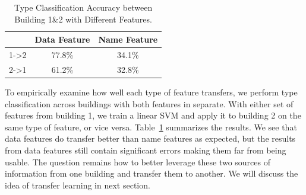 \begin{table}[h]
\centering
\begin{tabular}{l|c|c}
\hline
                & Data Feature & Name Feature \\ \hline
1-\textgreater2 & 77.8\%       & 34.1\%       \\
2-\textgreater1 & 61.2\%       & 32.8\%       \\ \hline
\end{tabular}
\caption{Type Classification Accuracy between Building 1\&2 with Different Features.}
\label{table:clf}
\end{table}


To empirically examine how well each type of feature transfers, we perform type classification across buildings with both features in separate. With either set of features from building 1, we train a linear SVM and apply it to building 2 on the same type of feature, or vice versa. Table~\ref{table:clf} summarizes the results.
We see that data features do transfer better than name features as expected, but the results from data features still contain significant errors making them far from being usable. 
The question remains how to better leverage these two sources of information from one building and transfer them to another.
We will discuss the idea of transfer learning in next section.

